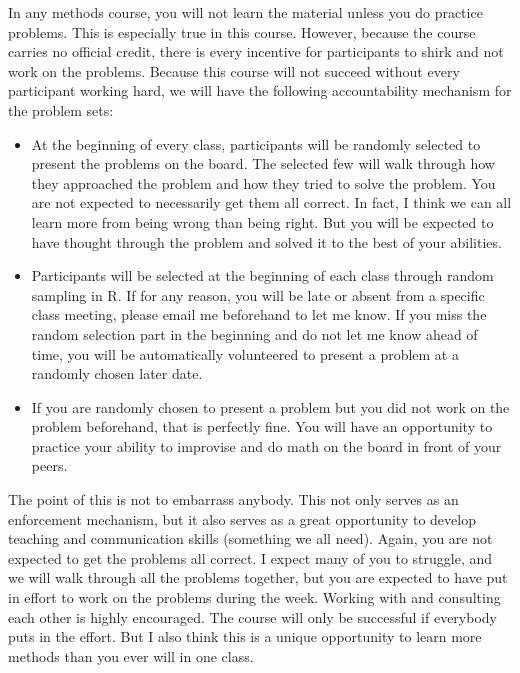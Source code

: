 \documentclass[10pt,a4paper]{article}
\begin{document}
In any methods course, you will not learn the material unless you do practice problems.  This is especially true in this course.  However, because the course carries no official credit, there is every incentive for participants to shirk and not work on the problems.  Because this course will not succeed without every participant working hard, we will have the following accountability mechanism for the problem sets:

\begin{itemize}
\item At the beginning of every class, participants will be randomly selected to present the problems on the board.  The selected few will walk through how they approached the problem and how they tried to solve the problem.  You are not expected to necessarily get them all correct.  In fact, I think we can all learn more from being wrong than being right.  But you will be expected to have thought through the problem and solved it to the best of your abilities.
\item Participants will be selected at the beginning of each class through random sampling in R.  If for any reason, you will be late or absent from a specific class meeting, please email me beforehand to let me know.  If you miss the random selection part in the beginning and do not let me know ahead of time, you will be automatically volunteered to present a problem at a randomly chosen later date.
\item If you are randomly chosen to present a problem but you did not work on the problem beforehand, that is perfectly fine.  You will have an opportunity to practice your ability to improvise and do math on the board in front of your peers.
\end{itemize}

The point of this is not to embarrass anybody.  This not only serves as an enforcement mechanism, but it also serves as a great opportunity to develop teaching and communication skills (something we all need).  Again, you are not expected to get the problems all correct.  I expect many of you to struggle, and we will walk through all the problems together, but you are expected to have put in effort to work on the problems during the week.  Working with and consulting each other is highly encouraged.  The course will only be successful if everybody puts in the effort.  But I also think this is a unique opportunity to learn more methods than you ever will in one class. \\
\end{document}
